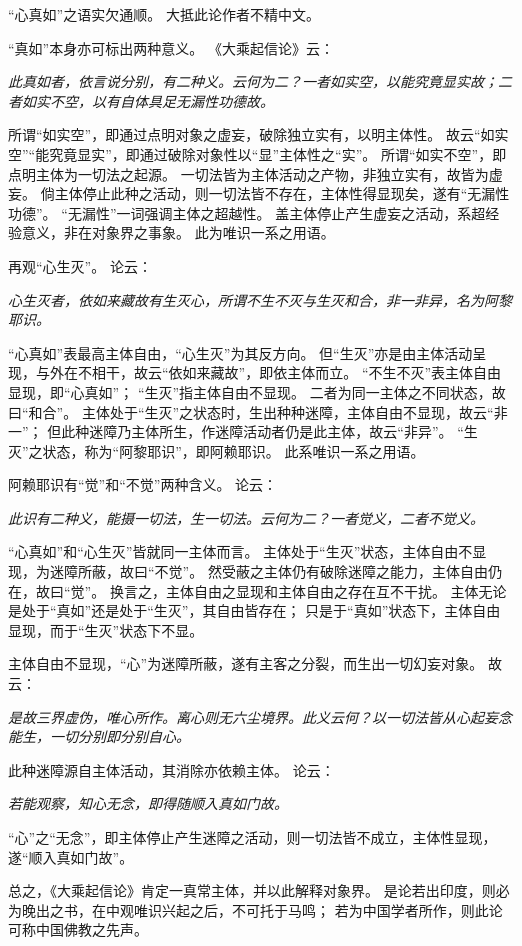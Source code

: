 \documentclass[11pt]{article}
\begin{document}
“心真如”之语实欠通顺。
大抵此论作者不精中文。

\par

“真如”本身亦可标出两种意义。
《大乘起信论》云：

\textit{此真如者，依言说分别，有二种义。云何为二？一者如实空，以能究竟显实故；二者如实不空，以有自体具足无漏性功德故。}

所谓“如实空”，即通过点明对象之虚妄，破除独立实有，以明主体性。
故云“如实空”“能究竟显实”，即通过破除对象性以“显”主体性之“实”。
所谓“如实不空”，即点明主体为一切法之起源。
一切法皆为主体活动之产物，非独立实有，故皆为虚妄。
倘主体停止此种之活动，则一切法皆不存在，主体性得显现矣，遂有“无漏性功德”。
“无漏性”一词强调主体之超越性。
盖主体停止产生虚妄之活动，系超经验意义，非在对象界之事象。
此为唯识一系之用语。

\par

再观“心生灭”。
论云：

\textit{心生灭者，依如来藏故有生灭心，所谓不生不灭与生灭和合，非一非异，名为阿黎耶识。}

“心真如”表最高主体自由，“心生灭”为其反方向。
但“生灭”亦是由主体活动呈现，与外在不相干，故云“依如来藏故”，即依主体而立。
“不生不灭”表主体自由显现，即“心真如”；
“生灭”指主体自由不显现。
二者为同一主体之不同状态，故曰“和合”。
主体处于“生灭”之状态时，生出种种迷障，主体自由不显现，故云“非一”；
但此种迷障乃主体所生，作迷障活动者仍是此主体，故云“非异”。
“生灭”之状态，称为“阿黎耶识”，即阿赖耶识。
此系唯识一系之用语。

\par

阿赖耶识有“觉”和“不觉”两种含义。
论云：

\textit{此识有二种义，能摄一切法，生一切法。云何为二？一者觉义，二者不觉义。}

“心真如”和“心生灭”皆就同一主体而言。
主体处于“生灭”状态，主体自由不显现，为迷障所蔽，故曰“不觉”。
然受蔽之主体仍有破除迷障之能力，主体自由仍在，故曰“觉”。
换言之，主体自由之显现和主体自由之存在互不干扰。
主体无论是处于“真如”还是处于“生灭”，其自由皆存在；
只是于“真如”状态下，主体自由显现，而于“生灭”状态下不显。

\par

主体自由不显现，“心”为迷障所蔽，遂有主客之分裂，而生出一切幻妄对象。
故云：

\textit{是故三界虚伪，唯心所作。离心则无六尘境界。此义云何？以一切法皆从心起妄念能生，一切分别即分别自心。}

此种迷障源自主体活动，其消除亦依赖主体。
论云：

\textit{若能观察，知心无念，即得随顺入真如门故。}

“心”之“无念”，即主体停止产生迷障之活动，则一切法皆不成立，主体性显现，遂“顺入真如门故”。

\par

总之，《大乘起信论》肯定一真常主体，并以此解释对象界。
是论若出印度，则必为晚出之书，在中观唯识兴起之后，不可托于马鸣；
若为中国学者所作，则此论可称中国佛教之先声。
\end{document}

